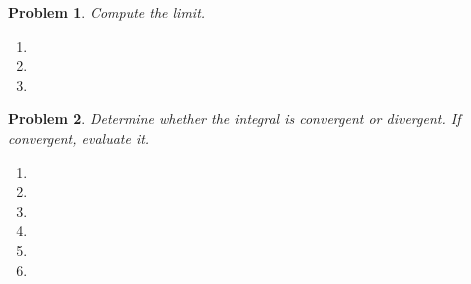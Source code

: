 \documentclass{article}
\renewcommand{\fcProblemRef}{\theproblem.\theenumi}
\newtheorem{problem}{Problem}
\begin{document}
\begin{problem}Compute the limit.
\begin{enumerate}[ref={\fcProblemRef}]
\item 
\item 
\item 
\end{enumerate}
\end{problem}



\begin{problem}Determine whether the integral is convergent or divergent. If convergent, evaluate it.

\begin{multicols}{2}
\begin{enumerate}[ref={\fcProblemRef}]
\item 
\item 

\item 
\item 
\item 
\item 

\end{enumerate}
\end{multicols}
\end{problem}


\end{document}
